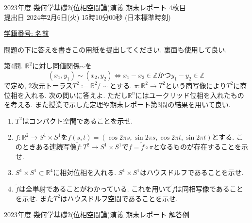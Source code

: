 \documentclass[dvipdfmx,a4paper,11pt]{article}
\newcommand{\R}{\mathbb{R}}
\newcommand{\Z}{\mathbb{Z}}
\theoremstyle{definition}
\begin{document}
\newpage
\begin{center}
{\Large 2023年度 幾何学基礎2(位相空間論)演義 期末レポート 4枚目} \\

\vspace{5pt}
{ \large 提出日 2024年2月6日(火) 15時10分00秒 (日本標準時刻)}
\end{center}

\vspace{2pt}
\begin{flushleft}
{ \large \underline{学籍番号: \hspace{4cm} 名前  \hspace{8cm} } }
\end{flushleft}

\begin{center}
 {\large 問題の下に答えを書きこの用紙を提出してください. 裏面も使用して良い.}
  \end{center}

   {\large 第4問.}   $\R^2$に対し同値関係$\sim$を
$$
(x_1, y_1)\sim (x_2, y_2) \Leftrightarrow x_1 - x_2 \in \Z \text{かつ} y_1 - y_2 \in \Z 
$$
で定め, 2次元トーラス$T^2 := \R^2/\sim$とする.
$\pi : \R^2 \rightarrow T^2$という商写像により$T^2$に商位相を入れる.
次の問いに答えよ. ただし$\R^n$にはユークリッド位相を入れたものを考える. また授業で示した定理や期末レポート第3問の結果を用いて良い. %
\begin{enumerate}
 \setlength{\parskip}{0cm}
  \setlength{\itemsep}{0pt}
  \item $T^2$はコンパクト空間であることを示せ. %
\item $f : \R^2 \rightarrow S^1 \times S^1$を$f(s,t) = (\cos 2 \pi s, \sin 2 \pi s,\cos 2 \pi t, \sin 2 \pi t)$とする. このときある連続写像$\widetilde{f}: T^2 \rightarrow S^1 \times S^1$で$f = \widetilde{f} \circ \pi $となるものが存在することを示せ. 
\item $S^1 \times S^1 \subset \R^4$に相対位相を入れる. $S^1 \times S^1$はハウスドルフであることを示せ.
\item $\widetilde{f}$は全単射であることがわかっている. これを用いて$\widetilde{f}$は同相写像であることを示せ. また$T^2$はハウスドルフ空間であることを示せ.

  \end{enumerate}

  \newpage
  
  
\begin{center}
{\Large 2023年度 幾何学基礎2(位相空間論)演義 期末レポート  解答例} \\

\vspace{5pt}
\end{center}
\end{document}
